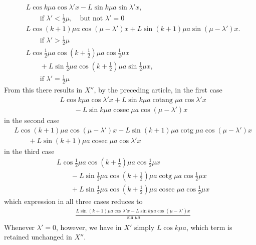 \[
\begin{aligned}
&L\cos k\mu a\cos\lambda'x-L\sin k\mu a\sin\lambda'x,
\\[5pt]
&\qquad\text{if }\lambda'<\tfrac12\mu,\quad\text{but not }\lambda'=0\\[5pt]
&L\cos(k+1)\mu a\cos(\mu-\lambda')x+L\sin(k+1)\mu a\sin(\mu-\lambda')x.
\\[5pt]
&\qquad\text{if }\lambda'>\tfrac12\mu\\[5pt]
&L\cos\tfrac12\mu a\cos(k+\tfrac12)\mu a\cos\tfrac12\mu x\\[5pt]
&\qquad{}+L\sin\tfrac12\mu a\cos(k+\tfrac12)\mu a\sin\tfrac12\mu x,
\\[5pt]
&\qquad\text{if }\lambda'=\tfrac12\mu
\end{aligned}
\]
From this there results in $X''$, by the preceding article, in the first case
\[
\begin{aligned}
&L\cos k\mu a\cos\lambda'x+L\sin k\mu a\operatorname{cotang}\mu a\cos\lambda'x\\[5pt]
&\qquad{}-L\sin k\mu a\operatorname{cosec}\mu a\cos(\mu-\lambda')x
\end{aligned}
\]
in the second case
\[
\begin{aligned}
&L\cos(k+1)\mu a\cos(\mu-\lambda')x-L\sin(k+1)\mu a\operatorname{cotg}\mu a\cos(\mu-\lambda')x\\[5pt]
&\qquad+L\sin(k+1)\mu a\operatorname{cosec}\mu a\cos\lambda'x
\end{aligned}
\]
in the third case
\[
\begin{aligned}
&L\cos\tfrac12\mu a\cos(k+\tfrac12)\mu a\cos\tfrac12\mu x\\[5pt]
&\qquad{}-L\sin\tfrac12\mu a\cos(k+\tfrac12)\mu a\operatorname{cotg}\mu a\cos\tfrac12\mu x\\[5pt]
&\qquad+L\sin\tfrac12\mu a\cos(k+\tfrac12)\mu a\operatorname{cosec}\mu a\cos\tfrac12\mu x
\end{aligned}
\]
which expression in all three cases reduces to
\[
\begin{aligned}
&\frac{L\sin(k+1)\mu a\cos\lambda'x-L\sin k\mu a\cos(\mu-\lambda')x}{\sin\mu a}
\end{aligned}
\]
Whenever $\lambda'=0$, however, we have in $X'$ simply $L\cos k\mu a$, which term is retained unchanged in $X''$.

\endgroup
